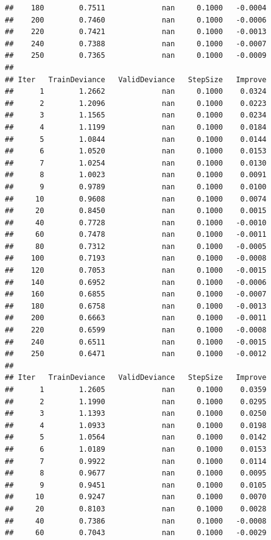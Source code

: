 \documentclass[
]{book}
\begin{document}
\begin{verbatim}
##    180        0.7511             nan     0.1000   -0.0004
##    200        0.7460             nan     0.1000   -0.0006
##    220        0.7421             nan     0.1000   -0.0013
##    240        0.7388             nan     0.1000   -0.0007
##    250        0.7365             nan     0.1000   -0.0009
## 
## Iter   TrainDeviance   ValidDeviance   StepSize   Improve
##      1        1.2662             nan     0.1000    0.0324
##      2        1.2096             nan     0.1000    0.0223
##      3        1.1565             nan     0.1000    0.0234
##      4        1.1199             nan     0.1000    0.0184
##      5        1.0844             nan     0.1000    0.0144
##      6        1.0520             nan     0.1000    0.0153
##      7        1.0254             nan     0.1000    0.0130
##      8        1.0023             nan     0.1000    0.0091
##      9        0.9789             nan     0.1000    0.0100
##     10        0.9608             nan     0.1000    0.0074
##     20        0.8450             nan     0.1000    0.0015
##     40        0.7728             nan     0.1000   -0.0010
##     60        0.7478             nan     0.1000   -0.0011
##     80        0.7312             nan     0.1000   -0.0005
##    100        0.7193             nan     0.1000   -0.0008
##    120        0.7053             nan     0.1000   -0.0015
##    140        0.6952             nan     0.1000   -0.0006
##    160        0.6855             nan     0.1000   -0.0007
##    180        0.6758             nan     0.1000   -0.0013
##    200        0.6663             nan     0.1000   -0.0011
##    220        0.6599             nan     0.1000   -0.0008
##    240        0.6511             nan     0.1000   -0.0015
##    250        0.6471             nan     0.1000   -0.0012
## 
## Iter   TrainDeviance   ValidDeviance   StepSize   Improve
##      1        1.2605             nan     0.1000    0.0359
##      2        1.1990             nan     0.1000    0.0295
##      3        1.1393             nan     0.1000    0.0250
##      4        1.0933             nan     0.1000    0.0198
##      5        1.0564             nan     0.1000    0.0142
##      6        1.0189             nan     0.1000    0.0153
##      7        0.9922             nan     0.1000    0.0114
##      8        0.9677             nan     0.1000    0.0095
##      9        0.9451             nan     0.1000    0.0105
##     10        0.9247             nan     0.1000    0.0070
##     20        0.8103             nan     0.1000    0.0028
##     40        0.7386             nan     0.1000   -0.0008
##     60        0.7043             nan     0.1000   -0.0029

\end{verbatim}
\end{document}
